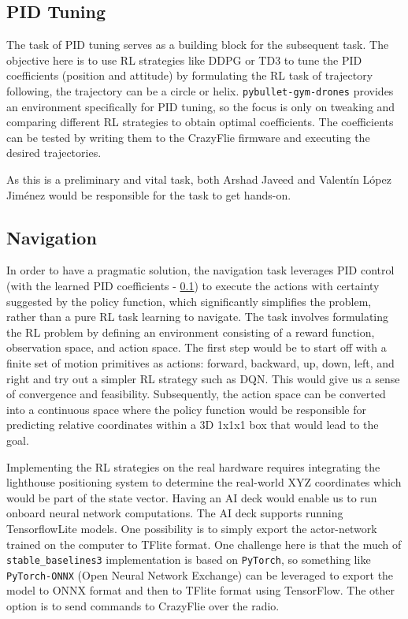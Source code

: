 \documentclass{article}
\begin{document}
\subsection{PID Tuning} \label{subsec:pid_tuning}

The task of PID tuning serves as a building block for the subsequent task. The objective here is to use RL strategies like DDPG or TD3 to tune the PID coefficients (position and attitude) by formulating the RL task of trajectory following, the trajectory can be a circle or helix. \verb|pybullet-gym-drones| provides an environment specifically for PID tuning, so the focus is only on tweaking and comparing different RL strategies to obtain optimal coefficients. The coefficients can be tested by writing them to the CrazyFlie firmware and executing the desired trajectories.  

As this is a preliminary and vital task, both Arshad Javeed and Valentín López Jiménez would be responsible for the task to get hands-on.

\subsection{Navigation} \label{subsec:nav}

In order to have a pragmatic solution, the navigation task leverages PID control (with the learned PID coefficients - \ref{subsec:pid_tuning}) to execute the actions with certainty suggested by the policy function, which significantly simplifies the problem, rather than a pure RL task learning to navigate. The task involves formulating the RL problem by defining an environment consisting of a reward function, observation space, and action space. The first step would be to start off with a finite set of motion primitives as actions: forward, backward, up, down, left, and right and try out a simpler RL strategy such as DQN. This would give us a sense of convergence and feasibility. Subsequently, the action space can be converted into a continuous space where the policy function would be responsible for predicting relative coordinates within a 3D 1x1x1 box that would lead to the goal.

Implementing the RL strategies on the real hardware requires integrating the lighthouse positioning system to determine the real-world XYZ coordinates which would be part of the state vector. Having an AI deck would enable us to run onboard neural network computations. The AI deck supports running TensorflowLite models. One possibility is to simply export the actor-network trained on the computer to TFlite format. One challenge here is that the much of \verb|stable_baselines3| implementation is based on \verb|PyTorch|, so something like \verb|PyTorch-ONNX| (Open Neural Network Exchange) can be leveraged to export the model to ONNX format and then to TFlite format using TensorFlow.
The other option is to send commands to CrazyFlie over the radio.
\end{document}
